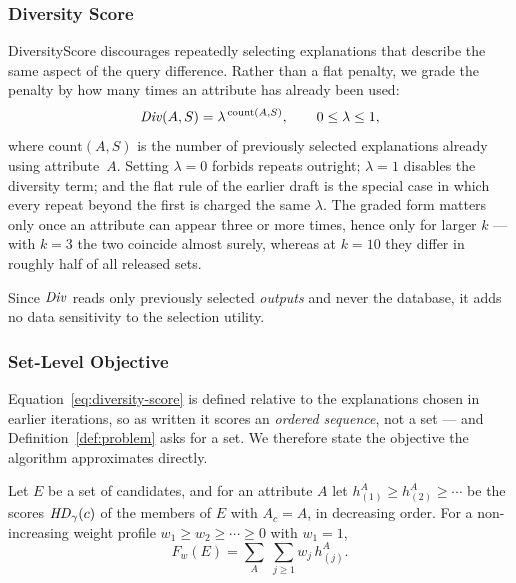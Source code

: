 \subsubsection{Diversity Score}
\label{subsubsec:diversity-score}

DiversityScore discourages repeatedly selecting explanations that describe the same aspect of the query difference.
Rather than a flat penalty, we grade the penalty by how many times an attribute has already been used:
\begin{equation}
\mathit{Div}(A,S)=\lambda^{\,\mathrm{count}(A,S)},
\qquad 0\le\lambda\le1,
\label{eq:diversity-score}
\end{equation}
where $\mathrm{count}(A,S)$ is the number of previously selected explanations already using attribute~$A$.
Setting $\lambda=0$ forbids repeats outright; $\lambda=1$ disables the diversity term; and the flat rule of the earlier draft is the special case in which every repeat beyond the first is charged the same $\lambda$.
The graded form matters only once an attribute can appear three or more times, hence only for larger $k$ --- with $k=3$ the two coincide almost surely, whereas at $k=10$ they differ in roughly half of all released sets.

Since $\mathit{Div}$ reads only previously selected \emph{outputs} and never the database, it adds no data sensitivity to the selection utility.

\subsubsection{Set-Level Objective}
\label{subsubsec:set-objective}

Equation~\eqref{eq:diversity-score} is defined relative to the explanations chosen in earlier iterations, so as written it scores an \emph{ordered sequence}, not a set --- and Definition~\ref{def:problem} asks for a set.
We therefore state the objective the algorithm approximates directly.

\begin{definition}
\label{def:setobj}
Let $E$ be a set of candidates, and for an attribute $A$ let
$h^A_{(1)}\ge h^A_{(2)}\ge\cdots$ be the scores $\mathit{HD}_\gamma(c)$ of the members of $E$ with $A_c=A$, in decreasing order.
For a non-increasing weight profile $w_1\ge w_2\ge\cdots\ge0$ with $w_1=1$,
\begin{equation}
F_w(E)=\sum_{A}\;\sum_{j\ge1} w_j\, h^A_{(j)} .
\label{eq:set-objective}
\end{equation}
\end{definition}

